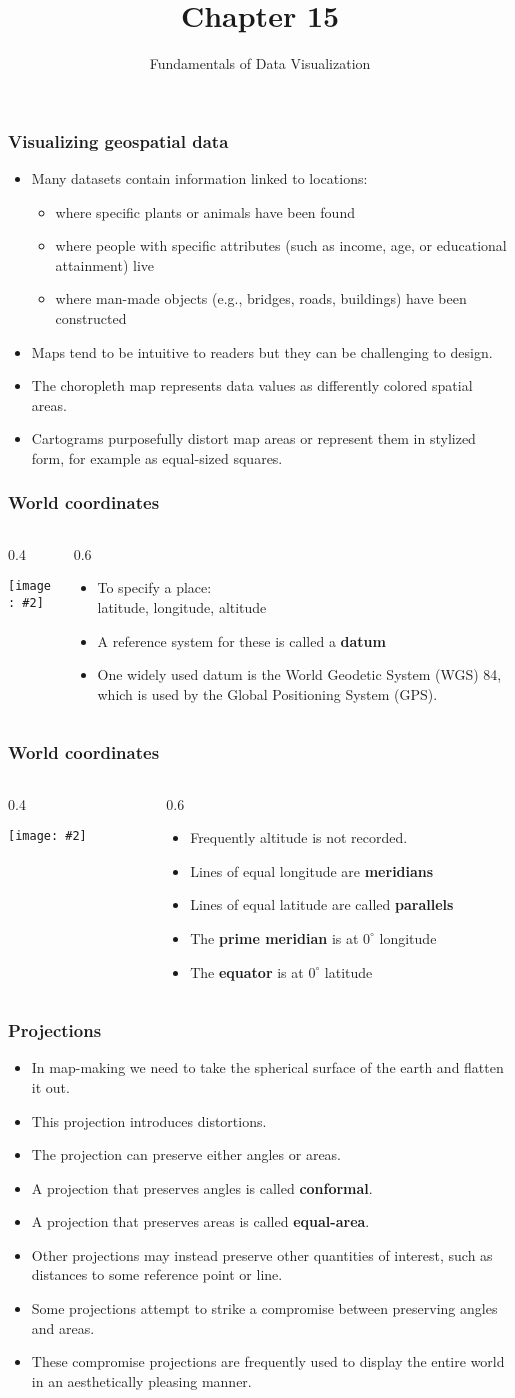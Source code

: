 \documentclass{beamer}
\author{Fundamentals of Data Visualization}
\title{Chapter 15}
\newcommand{\bi}{\begin{itemize}}
\newcommand{\li}{\item}
\newcommand{\ei}{\end{itemize}}
\newcommand{\fig}[2]{\centerline{\texttt{[image: \#2]}}}
\newcommand{\bfr}[1]{\begin{frame}[fragile]\frametitle{{ #1 }}}
\newcommand{\cola}[1]{\begin{columns}\begin{column}{#1\textwidth}}
\newcommand{\colb}[1]{\end{column}\begin{column}{#1\textwidth}}
\newcommand{\colc}{\end{column}\end{columns}}
\begin{document}
\begin{frame}
\maketitle
\end{frame}

\bfr{Visualizing geospatial data}
\bi
\li Many datasets contain information linked to locations:
\bi
\li where specific plants or animals have been found 
\li  where people with specific attributes (such as income, age, or educational attainment) live
\li where man-made objects (e.g., bridges, roads, buildings) have been constructed 
\ei
\li
Maps tend to be intuitive to readers but they can be challenging to design. 
\li The choropleth map represents data values as differently colored spatial areas.
\li  Cartograms purposefully distort map areas or represent them in stylized form, for example as equal-sized squares.
\ei
\end{frame}

\bfr{World coordinates}
\cola{0.4}
\fig{1.5}{world-orthographic-1.png}
\colb{0.6}
\bi
\li To specify a place:\\ latitude, longitude, altitude
\li A reference system for these is called a {\bf datum}
\li One widely used datum is the World Geodetic System (WGS) 84, which is used by the Global Positioning System (GPS).
\ei
\colc
\end{frame}

\bfr{World coordinates}
\cola{0.4}
\fig{1.5}{world-orthographic-1.png}
\colb{0.6}
\bi
\li Frequently altitude is not recorded.
\li Lines of equal longitude are {\bf meridians}
\li Lines of equal latitude are called {\bf parallels}
\li The {\bf prime meridian} is at $0^\circ$ longitude
\li The {\bf equator} is at $0^\circ$ latitude
\ei
\colc
\end{frame}

\bfr{Projections}
\bi
\li In map-making we need to take the spherical surface of the earth and flatten it out.
\li This  projection  introduces distortions.
\li The projection can preserve either angles or areas. 
\li A projection that preserves angles is called {\bf conformal}.
\li A projection that preserves areas is called {\bf equal-area}.
\li  Other projections may  instead preserve other quantities of interest, such as distances to some reference point or line. 
\li Some projections attempt to strike a compromise between preserving angles and areas.
\li These compromise projections are frequently used to display the entire world in an aesthetically pleasing manner.
\ei
\end{frame}
\end{document}
